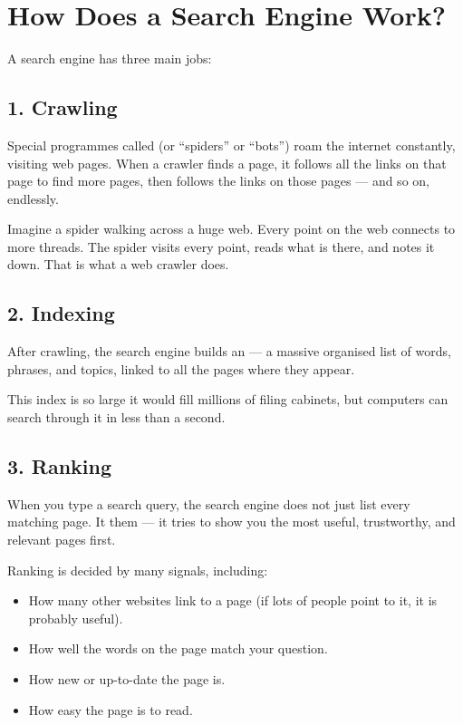 \sectionrule

\section*{How Does a Search Engine Work?}

A search engine has three main jobs:

\subsection*{1. Crawling}

Special programmes called  (or ``spiders'' or ``bots'') roam the internet
constantly, visiting web pages.
When a crawler finds a page, it follows all the links on that page to find more pages,
then follows the links on those pages — and so on, endlessly.

\begin{picturethis}
  Imagine a spider walking across a huge web.
  Every point on the web connects to more threads.
  The spider visits every point, reads what is there, and notes it down.
  That is what a web crawler does.
\end{picturethis}

\subsection*{2. Indexing}

After crawling, the search engine builds an  —
a massive organised list of words, phrases, and topics,
linked to all the pages where they appear.

This index is so large it would fill millions of filing cabinets,
but computers can search through it in less than a second.

\subsection*{3. Ranking}

When you type a search query, the search engine does not just list every matching page.
It  them — it tries to show you the most useful, trustworthy, and relevant pages first.

Ranking is decided by many signals, including:
\begin{itemize}
  \item How many other websites link to a page (if lots of people point to it, it is probably useful).
  \item How well the words on the page match your question.
  \item How new or up-to-date the page is.
  \item How easy the page is to read.
\end{itemize}

